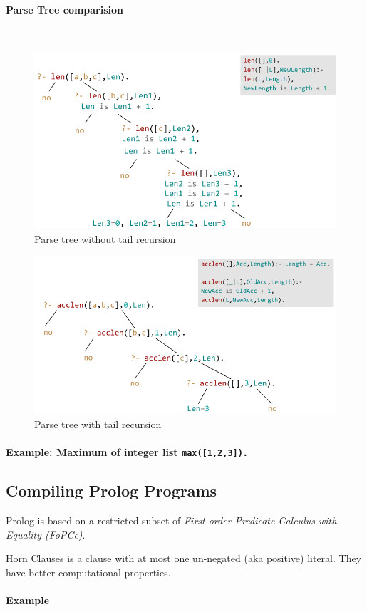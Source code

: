 \paragraph{Parse Tree comparision} \hfill \\

\begin{figure}[h]
	\centering
	\includegraphics[width=0.5\linewidth]{images/parse_tree_acclen_2}
	\caption{Parse tree without tail recursion}
	\label{fig:parsetreeacclen2}
\end{figure}

\begin{figure}[h]
\centering
\includegraphics[width=0.5\linewidth]{images/parse_tree_acclen_tail_recursion}
\caption{Parse tree with tail recursion}
\label{fig:parsetreeacclentailrecursion}
\end{figure}

\paragraph{Example: Maximum of integer list \lstinline|max([1,2,3]).|}


\subsection{Compiling Prolog Programs}

Prolog is based on a restricted subset of \emph{First order Predicate Calculus with Equality (FoPCe)}.

Horn Clauses is a clause with at most one un-negated (aka positive) literal. They have better computational properties.

\paragraph{Example}

